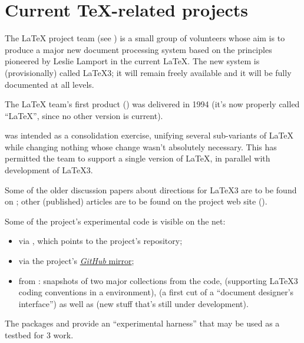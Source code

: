 
\section{Current \TeX{}-related projects}


The \LaTeX{} project team (see )
is a small group of volunteers whose aim is
to produce a major new document processing system based on the
principles pioneered by Leslie Lamport in the current \LaTeX{}.  The
new system is (provisionally) called \LaTeX{}3; it
will remain freely available and it will be fully documented at
all levels.

The \LaTeX{} team's first product (\LaTeXe{}) was delivered in 1994
(it's now properly called ``\LaTeX{}'', since no other version is current).

\LaTeXe{} was intended as a consolidation exercise, unifying several
sub-variants of \LaTeX{} while changing nothing whose change wasn't
absolutely necessary.  This has permitted the team to support a single
version of \LaTeX{}, in parallel with development of \LaTeX{}3.

Some of the older discussion papers about directions for \LaTeX{}3 are
to be found on ; other (published) articles are to be found
on the project web site ().

Some of the project's experimental code is visible on the net:
\begin{itemize}
\item via , which points
  to the project's  repository;
\item via the project's
  \href{https://github.com/latex3/svn-mirror}{\emph{GitHub} mirror};
\item from : snapshots of two major collections from the
  code,  (supporting \LaTeX{}3 coding conventions in
  a \LaTeXe{} environment),  (a first cut of a
  ``document designer's interface'') as well as
   (new stuff that's still under
  development).
\end{itemize}
The packages  and  provide an
``experimental harness'' that may be used as a testbed for \latex{}3
work.

